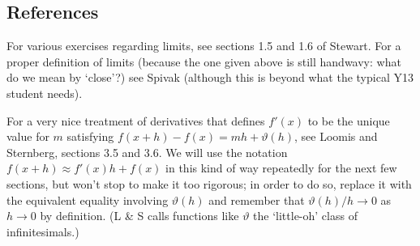 \subsection{References}
For various exercises regarding limits, see sections 1.5 and 1.6 of Stewart. For a proper definition of limits (because the one given
above is still handwavy: what do we mean by `close'?) see Spivak (although this is beyond what the typical Y13 student needs).

For a very nice treatment of derivatives that defines $ f'(x) $ to be the unique value for $ m $ satisfying $ f(x + h) - f(x) = mh + \vartheta(h) $,
see Loomis and Sternberg, sections 3.5 and 3.6. We will use the notation $ f(x + h) \approx f'(x) h + f(x) $ in this kind of way repeatedly
for the next few sections, but won't stop to make it too rigorous; in order to do so, replace it with the equivalent equality involving $ \vartheta(h) $
and remember that $ \vartheta(h)/h \to 0 $ as $ h \to 0 $ by definition. (L \& S calls functions like $ \vartheta $ the `little-oh' class of infinitesimals.)

